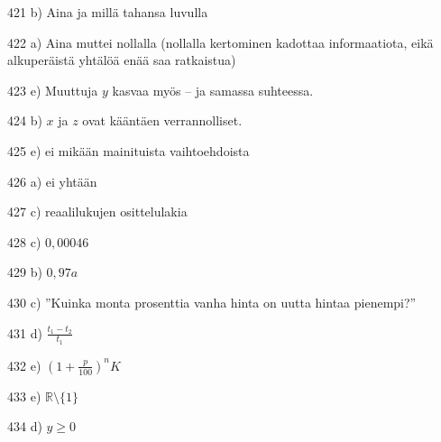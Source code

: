 \begin{Vastaus}{421}
b) Aina ja millä tahansa luvulla
	
\end{Vastaus}
\begin{Vastaus}{422}
a) Aina muttei nollalla (nollalla kertominen kadottaa informaatiota, eikä alkuperäistä yhtälöä enää saa ratkaistua)
\end{Vastaus}
\begin{Vastaus}{423}
e) Muuttuja $y$ kasvaa myös -- ja samassa suhteessa.
\end{Vastaus}
\begin{Vastaus}{424}
b) $x$ ja $z$ ovat kääntäen verrannolliset.
	
\end{Vastaus}
\begin{Vastaus}{425}
e) ei mikään mainituista vaihtoehdoista
	
\end{Vastaus}
\begin{Vastaus}{426}
a) ei yhtään
	
\end{Vastaus}
\begin{Vastaus}{427}
	c) reaalilukujen osittelulakia
	
\end{Vastaus}
\begin{Vastaus}{428}
	c) $0,00046$
	
\end{Vastaus}
\begin{Vastaus}{429}
b) $0,97a$
	
\end{Vastaus}
\begin{Vastaus}{430}
c) ''Kuinka monta prosenttia vanha hinta on uutta hintaa pienempi?''
	
\end{Vastaus}
\begin{Vastaus}{431}
d) $\frac{t_1-t_2}{t_1}$
	
\end{Vastaus}
\begin{Vastaus}{432}
e) $(1+\frac{p}{100})^nK$
	
\end{Vastaus}
\begin{Vastaus}{433}
	 e) $\mathbb{R}\setminus \lbrace 1 \rbrace$
    
\end{Vastaus}
\begin{Vastaus}{434}
	 d) $y\geq 0$
    
\end{Vastaus}
